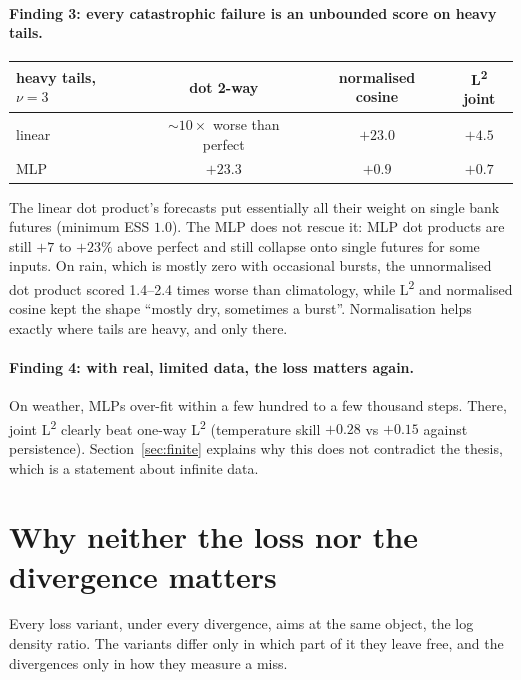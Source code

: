 \documentclass[11pt]{article}
\newcommand{\Ltwo}{L\textsuperscript{2}}
\theoremstyle{plain}
\theoremstyle{definition}
\theoremstyle{remark}
\begin{document}
\paragraph{Finding 3: every catastrophic failure is an unbounded score on heavy tails.}
\begin{center}\small
\begin{tabular}{@{}lccc@{}}
\toprule
heavy tails, $\nu=3$ & dot 2-way & normalised cosine & \Ltwo{} joint \\
\midrule
linear & $\sim10\times$ worse than perfect & $+23.0$ & $+4.5$ \\
MLP    & $+23.3$ & $+0.9$ & $+0.7$ \\
\bottomrule
\end{tabular}
\end{center}
The linear dot product's forecasts put essentially all their weight on single bank futures
(minimum ESS $1.0$). The MLP does not rescue it: MLP dot products are still $+7$ to $+23\%$
above perfect and still collapse onto single futures for some inputs. On rain, which is
mostly zero with occasional bursts, the unnormalised dot product scored 1.4--2.4 times
worse than climatology, while \Ltwo{} and normalised cosine kept the shape ``mostly dry,
sometimes a burst''. Normalisation helps exactly where tails are heavy, and only there.

\paragraph{Finding 4: with real, limited data, the loss matters again.} On weather, MLPs
over-fit within a few hundred to a few thousand steps. There, joint \Ltwo{} clearly beat
one-way \Ltwo{} (temperature skill $+0.28$ vs $+0.15$ against persistence). Section~\ref{sec:finite}
explains why this does not contradict the thesis, which is a statement about infinite data.

\section{Why neither the loss nor the divergence matters}\label{sec:loss}

Every loss variant, under every divergence, aims at the same object, the log density ratio.
The variants differ only in which part of it they leave free, and the divergences only in
how they measure a miss.
\end{document}
